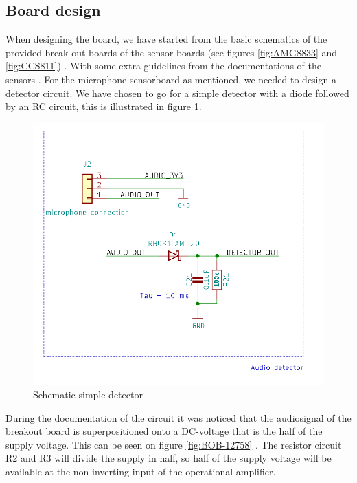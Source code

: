\documentclass[11pt,a4paper]{article}
\begin{document}
\subsection{Board design}
When designing the board, we have started from the basic schematics of the provided break out boards of the sensor boards (see figures \ref{fig:AMG8833} and \ref{fig:CCS811}) \cite{bib:AMG8833_schematic} \cite{bib:CCS811_schematic} . With some extra guidelines from the documentations of the sensors  \cite{bib:AMG8833} \cite{bib:CCS811}. For the microphone sensorboard as mentioned, we needed to design a detector circuit. We have chosen to go for a simple detector with a diode followed by an RC circuit, this is illustrated in figure \ref{fig:simple_detector}.
\begin{figure}[H]
	\centering
	\includegraphics[width=0.8\linewidth]{Schematic_audio_detector.png}
	\caption{Schematic simple detector \cite{breakout_microphone}}
	\label{fig:simple_detector}
\end{figure}
During the documentation of the circuit it was noticed that the audiosignal of the breakout board is superpositioned onto a DC-voltage that is the half of the supply voltage. This can be seen on figure \ref{fig:BOB-12758} \cite{breakout_microphone} . The resistor circuit R2 and R3 will divide the supply in half, so half of the supply voltage will be available at the non-inverting input of the operational amplifier.
\end{document}
